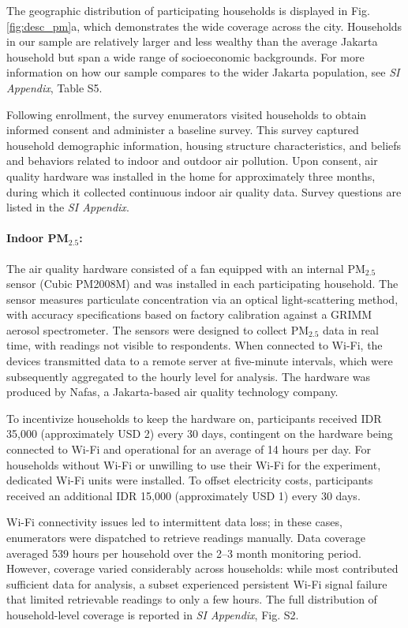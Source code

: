 \documentclass[9pt,twocolumn,twoside]{pnas-new}
\begin{document}
The geographic distribution of participating households is displayed in Fig. \ref{fig:desc_pm}a, which demonstrates the wide coverage across the city. Households in our sample are relatively larger and less wealthy than the average Jakarta household but span a wide range of socioeconomic backgrounds. For more information on how our sample compares to the wider Jakarta population, see \textit{SI Appendix}, Table S5.

Following enrollment, the survey enumerators visited households to obtain informed consent and administer a baseline survey. This survey captured household demographic information, housing structure characteristics, and beliefs and behaviors related to indoor and outdoor air pollution. Upon consent, air quality hardware was installed in the home for approximately three months, during which it collected continuous indoor air quality data. Survey questions are listed in the \textit{SI Appendix}.

\paragraph{Indoor PM$_{2.5}$:} The air quality hardware consisted of a fan equipped with an internal PM$_{2.5}$ sensor (Cubic PM2008M) and was installed in each participating household. The sensor measures particulate concentration via an optical light-scattering method, with accuracy specifications based on factory calibration against a GRIMM aerosol spectrometer. 
The sensors were designed to collect PM$_{2.5}$ data in real time, with readings not visible to respondents. When connected to Wi-Fi, the devices transmitted data to a remote server at five-minute intervals, which were subsequently aggregated to the hourly level for analysis. The hardware was produced by Nafas, a Jakarta-based air quality technology company.

To incentivize households to keep the hardware on, participants received IDR 35,000 (approximately USD 2) every 30 days, contingent on the hardware being connected to Wi-Fi and operational for an average of 14 hours per day. For households without Wi-Fi or unwilling to use their Wi-Fi for the experiment, dedicated Wi-Fi units were installed. To offset electricity costs, participants received an additional IDR 15,000 (approximately USD 1) every 30 days.

Wi-Fi connectivity issues led to intermittent data loss; in these cases, enumerators were dispatched to retrieve readings manually. Data coverage averaged 539 hours per household over the 2–3 month monitoring period. However, coverage varied considerably across households: while most contributed sufficient data for analysis, a subset experienced persistent Wi-Fi signal failure that limited retrievable readings to only a few hours. The full distribution of household-level coverage is reported in \textit{SI Appendix}, Fig. S2.
\end{document}
